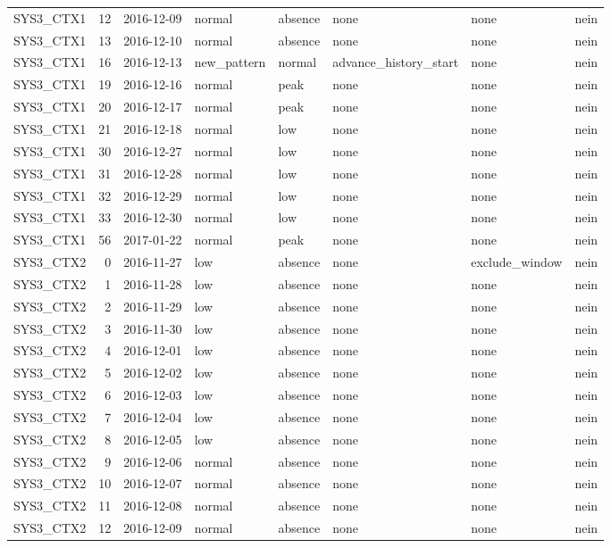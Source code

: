 \begin{tabular}{lrllllll}
SYS3\_CTX1 & 12 & 2016-12-09 & normal & absence & none & none & nein \\
SYS3\_CTX1 & 13 & 2016-12-10 & normal & absence & none & none & nein \\
SYS3\_CTX1 & 16 & 2016-12-13 & new\_pattern & normal & advance\_history\_start & none & nein \\
SYS3\_CTX1 & 19 & 2016-12-16 & normal & peak & none & none & nein \\
SYS3\_CTX1 & 20 & 2016-12-17 & normal & peak & none & none & nein \\
SYS3\_CTX1 & 21 & 2016-12-18 & normal & low & none & none & nein \\
SYS3\_CTX1 & 30 & 2016-12-27 & normal & low & none & none & nein \\
SYS3\_CTX1 & 31 & 2016-12-28 & normal & low & none & none & nein \\
SYS3\_CTX1 & 32 & 2016-12-29 & normal & low & none & none & nein \\
SYS3\_CTX1 & 33 & 2016-12-30 & normal & low & none & none & nein \\
SYS3\_CTX1 & 56 & 2017-01-22 & normal & peak & none & none & nein \\
SYS3\_CTX2 & 0 & 2016-11-27 & low & absence & none & exclude\_window & nein \\
SYS3\_CTX2 & 1 & 2016-11-28 & low & absence & none & none & nein \\
SYS3\_CTX2 & 2 & 2016-11-29 & low & absence & none & none & nein \\
SYS3\_CTX2 & 3 & 2016-11-30 & low & absence & none & none & nein \\
SYS3\_CTX2 & 4 & 2016-12-01 & low & absence & none & none & nein \\
SYS3\_CTX2 & 5 & 2016-12-02 & low & absence & none & none & nein \\
SYS3\_CTX2 & 6 & 2016-12-03 & low & absence & none & none & nein \\
SYS3\_CTX2 & 7 & 2016-12-04 & low & absence & none & none & nein \\
SYS3\_CTX2 & 8 & 2016-12-05 & low & absence & none & none & nein \\
SYS3\_CTX2 & 9 & 2016-12-06 & normal & absence & none & none & nein \\
SYS3\_CTX2 & 10 & 2016-12-07 & normal & absence & none & none & nein \\
SYS3\_CTX2 & 11 & 2016-12-08 & normal & absence & none & none & nein \\
SYS3\_CTX2 & 12 & 2016-12-09 & normal & absence & none & none & nein \\

\end{tabular}
